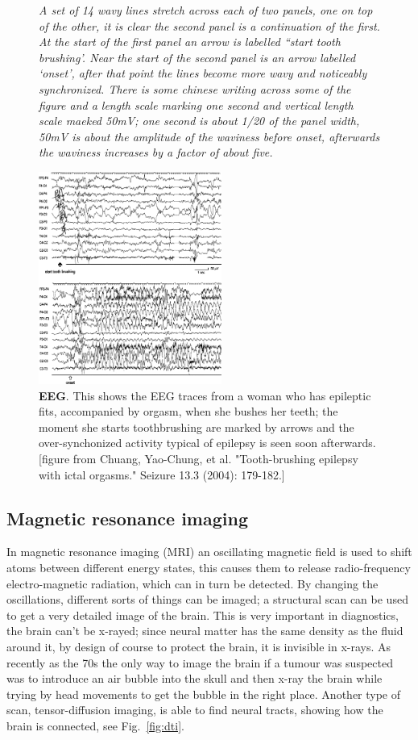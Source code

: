 \documentclass[12pt]{article}
\begin{document}
\begin{figure}
{\textsl{A set of 14 wavy lines stretch across each of two panels, one on top of the other, it is clear the second panel is a continuation of the first. At the start of the first panel an arrow is labelled ``start tooth brushing'. Near the start of the second panel is an arrow labelled `onset', after that point the lines become more wavy and noticeably synchronized. There is some chinese writing across some of the figure and a length scale marking one second and vertical length scale maeked 50mV; one second is about 1/20 of the panel width, 50mV is about the amplitude of the waviness before onset, afterwards the waviness increases by a factor of about five.}}
{
  \begin{center}
  \includegraphics[width=6cm]{eeg.png}
  \end{center}
}
\caption{\textbf{EEG}. This shows the EEG traces from a woman who
    has epileptic fits, accompanied by orgasm, when she bushes her
    teeth; the moment she starts toothbrushing are marked by arrows
    and the over-synchonized activity typical of epilepsy is seen soon
    afterwards. [figure from Chuang, Yao-Chung, et al. "Tooth-brushing
      epilepsy with ictal orgasms." Seizure 13.3 (2004):
      179-182.]\label{fig:eeg}}
\end{figure}



\subsection*{Magnetic resonance imaging}

In magnetic resonance imaging (MRI) an oscillating magnetic field is
used to shift atoms between different energy states, this causes them
to release radio-frequency electro-magnetic radiation, which can in
turn be detected. By changing the oscillations, different sorts of
things can be imaged; a structural scan can be used to get a very
detailed image of the brain. This is very important in diagnostics,
the brain can't be x-rayed; since neural matter has the same density
as the fluid around it, by design of course to protect the brain, it
is invisible in x-rays. As recently as the 70s the only way to image
the brain if a tumour was suspected was to introduce an air bubble
into the skull and then x-ray the brain while trying by head movements
to get the bubble in the right place. Another type of scan,
tensor-diffusion imaging, is able to find neural tracts, showing how the brain is connected, see Fig.~\ref{fig:dti}.
\end{document}
